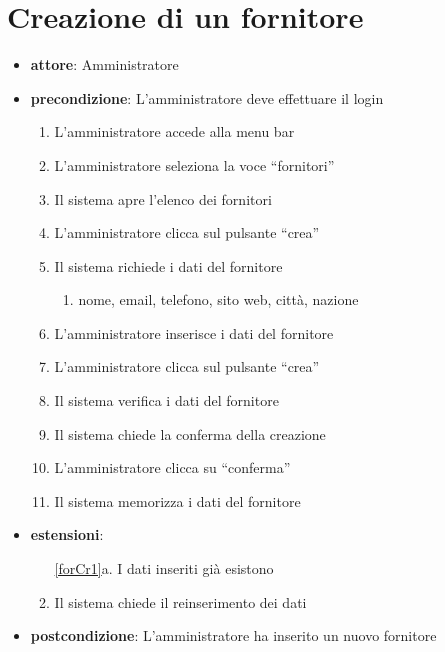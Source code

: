 \section{Creazione di un fornitore}
\begin{itemize}
	\item \textbf{attore}: Amministratore
	\item \textbf{precondizione}: L’amministratore deve effettuare il login
	
	\begin{enumerate}
		\item L’amministratore accede alla menu bar
		\item L’amministratore seleziona la voce “fornitori”
		\item Il sistema apre l’elenco dei fornitori
		\item L’amministratore clicca sul pulsante “crea”
		\item Il sistema richiede i dati del fornitore
		\begin{enumerate}
			\item nome, email, telefono, sito web, città, nazione
		\end{enumerate}
		\item L’amministratore inserisce i dati del fornitore
		\item L’amministratore clicca sul pulsante “crea”
		\label{forCr1}
		\item Il sistema verifica i dati del fornitore
		\item Il sistema chiede la conferma della creazione
		\item L’amministratore clicca su “conferma”
		\item Il sistema memorizza i dati del fornitore
	\end{enumerate}

	\item \textbf{estensioni}:
	\begin{enumerate}
		\item[\ref{forCr1}a.] I dati inseriti già esistono 
		\item Il sistema chiede il reinserimento dei dati
	\end{enumerate}

	\item \textbf{postcondizione}: L’amministratore ha inserito un nuovo fornitore
\end{itemize}
		

